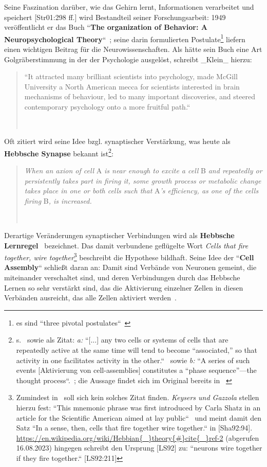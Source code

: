 Seine Faszination darüber, wie das Gehirn lernt, Informationen verarbeitet und speichert [Str01:298 ff.] wird Bestandteil seiner Forschungsarbeit: 1949 veröffentlicht er das Buch ``\textbf{The organization of Behavior: A Neuropsychological Theory}``~\cite{Heb49}; seine darin formulierten Postulate\footnote{
    es sind ``three pivotal postulates``~\cite[2]{Kle99}
} liefern einen wichtigen Beitrag für die Neurowissenschaften. Als hätte sein Buch eine Art Golgräberstimmung in der der Psychologie ausgelöst, schreibt _Klein_ hierzu:

\blockquote[{~\cite[2]{Kle99}}]{
    ``It attracted many
    brilliant scientists into psychology, made McGill University a North American mecca for scientists interested in brain mechanisms of behaviour, led to many important discoveries, and steered contemporary psychology onto a more fruitful path.``~\cite[1]{Kle99}
}

Oft zitiert wird seine Idee bzgl. synaptischer Verstärkung, was heute als \textbf{Hebbsche Synapse} bekannt ist\footnote{
    s.~\cite[43]{AR88} sowie als Zitat: \textit{a:} ``[...] any two cells or systems of cells that are repeatedly active at the same time will tend to become “associated,” so that activity in one facilitates activity in the other.``~\cite[52]{Heb88} sowie \textit{b:} ``A series of such events [Aktivierung von cell-assemblies] constitutes a “phase sequence”—the thought process``.~\cite[48]{Heb88}; die Aussage findet sich im Original bereits in ~\cite[xi-xix, ``Introduction``]{Heb49}
}:

\blockquote[{~\cite[50, Hervorhebung i.O.]{Heb88}}]{
    \textit{When an axion of cell} A \textit{is near enough to excite a cell} B \textit{and repeatedly or persistently takes part in firing it, some growth process or metabolic change takes place in one or both cells such that} A\textit{'s efficiency, as one of the cells firing} B\textit{, is increased.}
}


Derartige Veränderungen synaptischer Verbindungen wird als \textbf{Hebbsche Lernregel}~\cite[985]{BCP18} bezeichnet.
Das damit verbundene geflügelte Wort \textit{Cells that fire together, wire together}\footnote{
    Zumindest in~\cite{Heb49} soll sich kein solches Zitat finden. \textit{Keysers und Gazzola} stellen hierzu fest: ``This mnemonic phrase was first introduced by Carla Shatz in an article for the Scientific American aimed at lay public``~\cite[2, Fussnotenmarker entfernt]{KG14} und meint damit den Satz ``In a sense, then, cells that fire together wire together.`` in [Sha92:94]. \url{https://en.wikipedia.org/wiki/Hebbian{\_}theory{\#}cite{\_}ref-2} (abgerufen 16.08.2023) hingegen schreibt den Ursprung [LS92] zu: ``neurons wire together if they fire together.`` [LS92:211]
} beschreibt die Hypothese bildhaft.
Seine Idee der ``\textbf{Cell Assembly}`` schließt daran an: Damit sind Verbände von Neuronen gemeint, die miteinander verschaltet sind, und deren Verbindungen durch das Hebbsche Lernen so sehr verstärkt sind, das die Aktivierung einzelner Zellen in diesen Verbänden ausreicht, das alle Zellen aktiviert werden~\cite[907 f.]{BCP18}.


